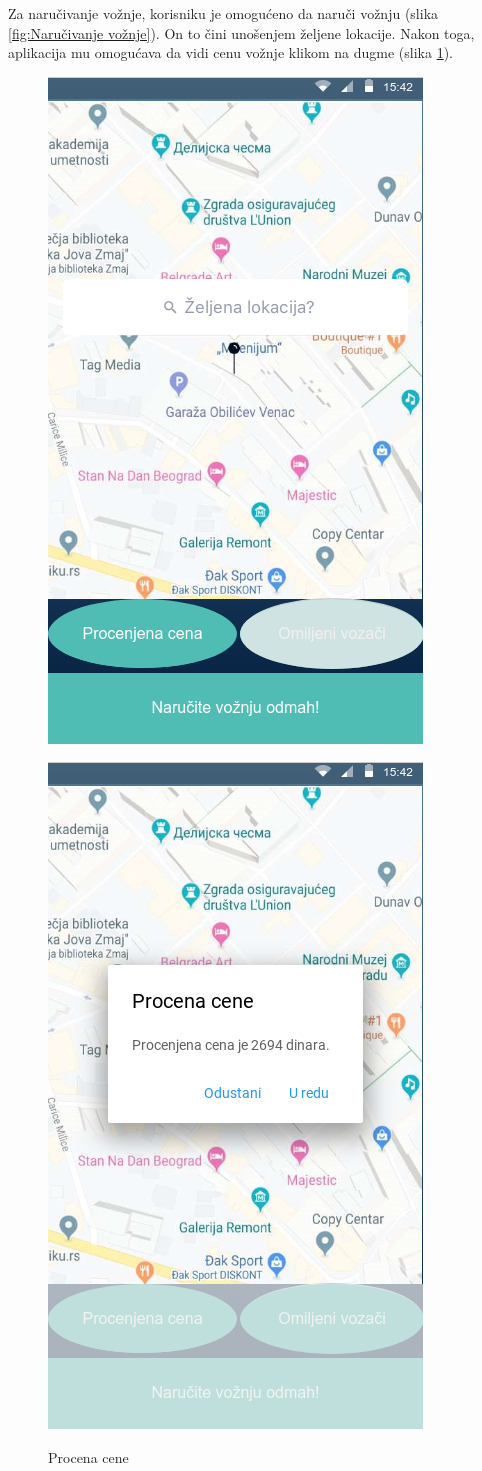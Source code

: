 Za naručivanje vožnje, korisniku je omogućeno da naruči vožnju (slika \ref{fig:Naručivanje vožnje}). On to čini unošenjem željene lokacije. Nakon toga, aplikacija mu omogućava da vidi cenu vožnje klikom na dugme  (slika \ref{fig:Procena cene}).


\begin{figure}[H]
\centering
\begin{minipage}{.5\textwidth}
  \centering
  \includegraphics[width=.4\linewidth]{Slike/Narucivanje_sa_adresom.png}
  \caption{Naručivanje vožnje}{}
  \label{fig:Naručivanje vožnje}
\end{minipage}%
\begin{minipage}{.5\textwidth}
  \centering
  \includegraphics[width=.4\linewidth]{Slike/Procena_cene.png}
   \caption{Procena cene}{}
  \label{fig:Procena cene}
\end{minipage}
\end{figure}

